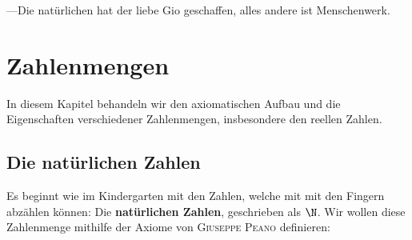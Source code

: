 \begin{savequote}[60mm]
---Die natürlichen hat der liebe Gio geschaffen, alles andere ist Menschenwerk.
\end{savequote}


\chapter{Zahlenmengen}

In diesem Kapitel behandeln wir den axiomatischen Aufbau und die Eigenschaften verschiedener Zahlenmengen, insbesondere den reellen Zahlen.

\section{Die natürlichen Zahlen} \label{cha_natural_numbers}
Es beginnt wie im Kindergarten mit den Zahlen, welche mit mit den Fingern abzählen können: Die \textbf{natürlichen Zahlen}, geschrieben als $\N$. Wir wollen diese Zahlenmenge mithilfe der Axiome von \textsc{Giuseppe Peano} definieren:
